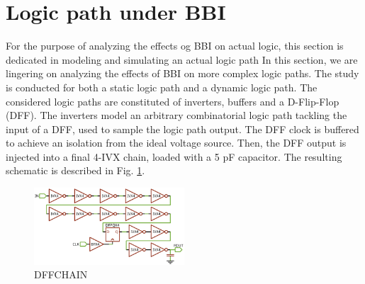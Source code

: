 
\section{Logic path under BBI}
For the purpose of analyzing the effects og BBI on actual logic, this section is dedicated in modeling and simulating an actual logic path
In this section, we are lingering on analyzing the effects of BBI on more complex logic paths.
The study is conducted for both a static logic path and a dynamic logic path.
The considered logic paths are constituted of inverters, buffers and a D-Flip-Flop (DFF).
The inverters model an arbitrary combinatorial logic path tackling the input of a DFF, used to sample the logic path output.
The DFF clock is buffered to achieve an isolation from the ideal voltage source.
Then, the DFF output is injected into a final 4-IVX chain, loaded with a 5 pF capacitor.
The resulting schematic is described in Fig. \ref{dffChain}.

\begin{figure}[h]
	\label{dffChain}
	\includegraphics[width=0.5\textwidth]{./figures/dff_ivx_chain_2.pdf}
	\caption{DFFCHAIN}
\end{figure}
